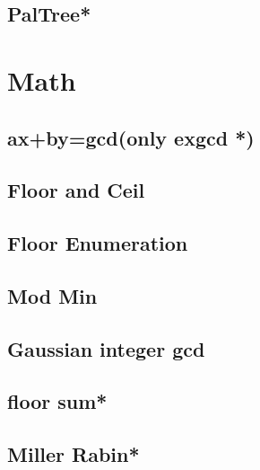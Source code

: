 \subsection{PalTree*} %



\section{Math}
\subsection{ax+by=gcd(only exgcd *)} %

\subsection{Floor and Ceil}

\subsection{Floor Enumeration}

\subsection{Mod Min}

\subsection{Gaussian integer gcd}

 \subsection{floor sum*} %
 
\subsection{Miller Rabin*} %

% 
% 
